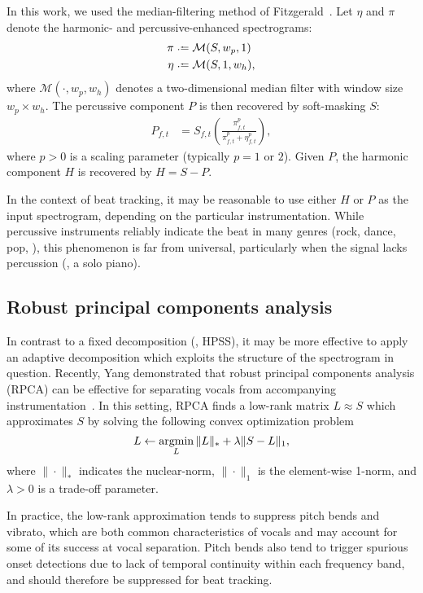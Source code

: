 \documentclass{article}
\begin{document}
In this work, we used the median-filtering method of 
Fitzgerald~\cite{fitzgerald2010harmonic}.  Let $\eta$ and $\pi$ denote the harmonic-
and percussive-enhanced spectrograms:
\begin{align*}
\pi  &\defeq \mathcal{M}(S, w_p, 1)\\
\eta &\defeq \mathcal{M}(S, 1, w_h),
\end{align*}
where $\mathcal{M}(\cdot, w_p, w_h)$ denotes a two-dimensional median filter with window 
size $w_p\times w_h$.
The percussive component $P$ is then recovered by soft-masking $S$:
\begin{align*}
P_{f,t} &= S_{f,t} \left(\frac{ \pi_{f,t}^p }{\pi_{f,t}^p + \eta_{f,t}^p}\right),
\end{align*}
where $p>0$ is a scaling parameter (typically $p=1$ or $2$). Given $P$, the harmonic 
component $H$ is recovered by ${H=S-P}$.

In the context of beat tracking, it may be reasonable to use either $H$ or $P$ as the
input spectrogram, depending on the particular instrumentation. While percussive
instruments reliably indicate the beat in many genres (rock, dance, pop, \etc), this
phenomenon is far from universal, particularly when the signal lacks percussion 
(\eg, a solo piano).

\subsection{Robust principal components analysis}
In contrast to a fixed decomposition (\ie, HPSS), it may be more effective to apply an
adaptive decomposition which exploits the structure of the spectrogram in question.
Recently, Yang demonstrated that robust principal components analysis (RPCA) can be
effective for separating vocals from accompanying instrumentation~\cite{yang2012sparse, 
candes2011robust}.  In this setting, RPCA finds a low-rank matrix $L \approx S$ which
approximates $S$ by solving the following convex optimization problem
\begin{equation}
L \leftarrow \operatorname*{argmin}_L \|L\|_* + \lambda \|S - L\|_1,
\end{equation}
where $\|\cdot\|_*$ indicates the nuclear-norm, $\|\cdot\|_1$ is the element-wise
1-norm, and $\lambda>0$ is a trade-off parameter.

In practice, the low-rank approximation tends to suppress pitch bends and vibrato,
which are both common characteristics of vocals and may account for some of its success
at vocal separation.  Pitch bends also tend to trigger spurious onset 
detections due to lack of temporal continuity within each frequency band, and should
therefore be suppressed for beat tracking.  
\end{document}
